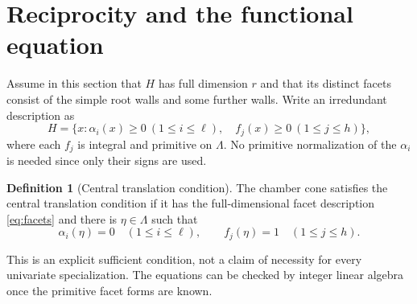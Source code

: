 \documentclass[11pt,a4paper]{article}
\theoremstyle{definition}
\newtheorem{definition}[proposition]{Definition}
\begin{document}
\section{Reciprocity and the functional equation}\label{sec:reciprocity}
Assume in this section that $H$ has full dimension $r$ and that its
distinct facets consist of the simple root walls and some further walls.
Write an irredundant description as
\begin{equation}\label{eq:facets}
 H=\{x:\alpha_i(x)\geq0\ (1\leq i\leq\ell),\quad
                  f_j(x)\geq0\ (1\leq j\leq h)\},
\end{equation}
where each $f_j$ is integral and primitive on $\Lambda$.
No primitive normalization of the $\alpha_i$ is needed since only
their signs are used.
\begin{definition}[Central translation condition]\label{def:translation}
The chamber cone satisfies the central translation condition if it has
the full-dimensional facet description \eqref{eq:facets} and there is
$\eta\in\Lambda$ such that
\begin{equation}\label{eq:eta}
 \alpha_i(\eta)=0\quad(1\leq i\leq\ell),\qquad
 f_j(\eta)=1\quad(1\leq j\leq h).
\end{equation}
\end{definition}
This is an explicit sufficient condition, not a claim of necessity for
every univariate specialization. The equations can be checked by
integer linear algebra once the primitive facet forms are known.
\end{document}
